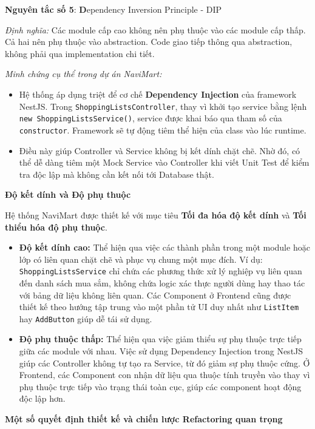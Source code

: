 \documentclass[../main.tex]{subfiles}
\begin{document}
\textbf{Nguyên tắc số 5}: \textbf{D}ependency Inversion Principle - DIP

\textit{Định nghĩa:} Các module cấp cao không nên phụ thuộc vào các module cấp thấp. Cả hai nên phụ thuộc vào abstraction. Code giao tiếp thông qua abstraction, không phải qua implementation chi tiết.

\textit{Minh chứng cụ thể trong dự án NaviMart:}
\begin{itemize}
    \item Hệ thống áp dụng triệt để cơ chế \textbf{Dependency Injection} của framework NestJS. Trong \texttt{ShoppingListsController}, thay vì khởi tạo service bằng lệnh \texttt{new ShoppingListsService()}, service được khai báo qua tham số của \texttt{constructor}. Framework sẽ tự động tiêm thể hiện của class vào lúc runtime.
    \item Điều này giúp Controller và Service không bị kết dính chặt chẽ. Nhờ đó, có thể dễ dàng tiêm một Mock Service vào Controller khi viết Unit Test để kiểm tra độc lập mà không cần kết nối tới Database thật.
\end{itemize}\vspace{1em}
\textbf{Độ kết dính và Độ phụ thuộc}

Hệ thống NaviMart được thiết kế với mục tiêu \textbf{Tối đa hóa độ kết dính} và \textbf{Tối thiểu hóa độ phụ thuộc}.
\begin{itemize}
    \item \textbf{Độ kết dính cao:} Thể hiện qua việc các thành phần trong một module hoặc lớp có liên quan chặt chẽ và phục vụ chung một mục đích. Ví dụ: \texttt{ShoppingListsService} chỉ chứa các phương thức xử lý nghiệp vụ liên quan đến danh sách mua sắm, không chứa logic xác thực người dùng hay thao tác với bảng dữ liệu không liên quan. Các Component ở Frontend cũng được thiết kế theo hướng tập trung vào một phần tử UI duy nhất như \texttt{ListItem} hay \texttt{AddButton} giúp dễ tái sử dụng.
    \item \textbf{Độ phụ thuộc thấp:} Thể hiện qua việc giảm thiểu sự phụ thuộc trực tiếp giữa các module với nhau. Việc sử dụng Dependency Injection trong NestJS giúp các Controller không tự tạo ra Service, từ đó giảm sự phụ thuộc cứng. Ở Frontend, các Component con nhận dữ liệu qua thuộc tính truyền vào thay vì phụ thuộc trực tiếp vào trạng thái toàn cục, giúp các component hoạt động độc lập hơn.
\end{itemize}

\vspace{1em}
\textbf{Một số quyết định thiết kế và chiến lược Refactoring quan trọng}
\end{document}
